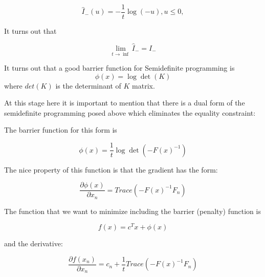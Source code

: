 \documentclass[12pt,letterpaper,doublespaced,ETD,dvips,proposal]{gtthesis}
\begin{document}
\begin{Body}
\begin{equation}
\hat{I}_{-}(u) = -\frac{1}{t}\log(-u), u\leq 0,
\end{equation}

It turns out that

\begin{equation}
\lim_{t\rightarrow \inf} \hat{I}_{-} = I_{-}
\end{equation}

It turns out that a good barrier function for Semidefinite
programming is
\begin{equation}
\phi(x)=\log \det(K)
\end{equation}
where $det(K)$ is the determinant of $K$ matrix.

At this stage here it is important to mention that there is a dual
form of the semidefinite programming posed above which eliminates
the equality constraint:

\vspace{1cm}


\vspace{1cm}

The barrier function for this form is

\begin{equation}
\phi(x)=\frac{1}{t}\log\det(-F(x)^{-1})
\end{equation}

The nice property of this function is that the gradient has the form:

\begin{equation}
\frac{\partial\phi(x)}{\partial x_{n}} = Trace(-F(x)^{-1}F_n)
\end{equation}

The function that we want to minimize including the barrier
(penalty) function is

\begin{equation}
f(x)=c^Tx+\phi(x)
\end{equation}

and the derivative:

\begin{equation}
\frac{\partial f(x_n)}{\partial x_{n}} = c_n
+\frac{1}{t}Trace(-F(x)^{-1}F_n)
\end{equation}


\end{Body}
\end{document}
